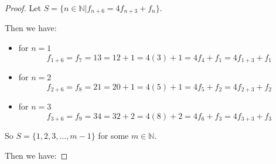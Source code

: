 \documentclass[12pt,letterpaper]{article}
\begin{document}
\begin{enumerate}
\begin{enumerate}
\begin{enumerate}
\begin{proof}
                Let $S = \{n \in \mathbb{N} | f_{n + 6} = 4f_{n + 3} + f_n\}$.

                Then we have:

                \begin{itemize}
                  \item for $n = 1$
                    \[f_{1 + 6} = f_7 = 13 = 12 + 1 = 4(3) + 1 = 4f_4 + f_1 = 4f_{1 + 3} + f_1\]
                  \item for $n = 2$
                    \[f_{2 + 6} = f_8 = 21 = 20 + 1 = 4(5) + 1 = 4f_5 + f_2 = 4f_{2 + 3} + f_2\]
                  \item for $n = 3$
                    \[f_{3 + 6} = f_9 = 34 = 32 + 2 = 4(8) + 2 = 4f_6 + f_3 = 4f_{3 + 3} + f_3\]
                \end{itemize}

                So $S = \{1, 2, 3, \dots, m - 1\}$ for some $m \in \mathbb{N}$.

                Then we have:


\end{proof}
\end{enumerate}
\end{enumerate}
\end{enumerate}
\end{document}
